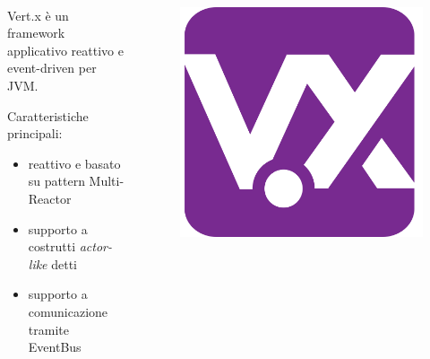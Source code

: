     \begin{frame}{\insertsectionhead}
      \framesubtitle{\insertsubsectionhead}

      \begin{columns}
        \begin{column}{.8\textwidth}
          \begin{block}{Vert.x}
             è un framework applicativo reattivo e event-driven per JVM.

            Caratteristiche principali:
            \begin{itemize}
              \item reattivo e basato su pattern Multi-Reactor
              \item supporto a costrutti \emph{actor-like} detti 
              \item supporto a comunicazione tramite EventBus
            \end{itemize}
          \end{block}
        \end{column}
        \begin{column}{.15\textwidth}
          \begin{figure}
            \includegraphics[width=\textwidth]{res/uml/vertx-logo-big.png}
          \end{figure}
        \end{column}
      \end{columns}


\end{frame}
